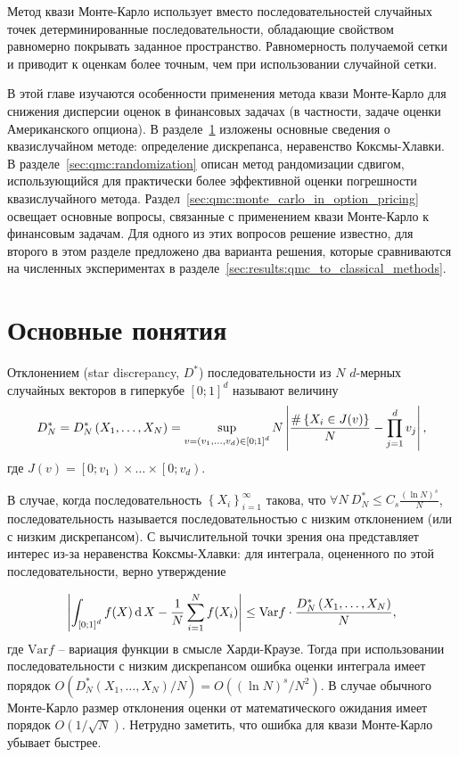 Метод квази Монте-Карло \cite{Chi2004} использует вместо последовательностей случайных точек детерминированные последовательности, обладающие свойством равномерно покрывать заданное пространство. Равномерность получаемой сетки и приводит к оценкам более точным, чем при использовании случайной сетки.

В этой главе изучаются особенности применения метода квази Монте-Карло для снижения дисперсии оценок в финансовых задачах (в частности, задаче оценки Американского опциона). В разделе~\ref{sec:qmc:qmc_definition} изложены основные сведения о квазислучайном методе: определение дискрепанса, неравенство Коксмы-Хлавки. В разделе~\ref{sec:qmc:randomization} описан метод рандомизации сдвигом, использующийся для практически более эффективной оценки погрешности квазислучайного метода. Раздел~\ref{sec:qmc:monte_carlo_in_option_pricing} освещает основные вопросы, связанные с применением квази Монте-Карло к финансовым задачам. Для одного из этих вопросов решение известно, для второго в этом разделе предложено два варианта решения, которые сравниваются на численных экспериментах в разделе~\ref{sec:results:qmc_to_classical_methods}. %

\section{Основные понятия} %
\label{sec:qmc:qmc_definition}

Отклонением (star discrepancy, $D^*$) последовательности из $N$ $d$-мерных случайных векторов в гиперкубе $\left[0;1\right]^d$ называют величину
$$D_N^* = D_N^*\left(X_1, \dots, X_N\right) = \sup_{v = (v_1, \dots, v_d) \in \left[0;1\right]^d} N \left\lvert\frac{\#\left\{ X_i \in J(v) \right\}}{N} - \prod_{j = 1}^d v_j\right\rvert,$$
где $J(v) = \left[0; v_1\right) \times \dots \times \left[0; v_d\right)$.

В случае, когда последовательность $\left\{ X_i\right\}_{i=1}^\infty$ такова, что $\forall N \: D_N^* \leq C_s \frac{(\ln N)^s}{N}$, последовательность называется последовательностью с низким отклонением (или с низким дискрепансом). С вычислительной точки зрения она представляет интерес из-за неравенства Коксмы-Хлавки: для интеграла, оцененного по этой последовательности, верно утверждение

\begin{equation}\label{eq:koksma-hlawka}
\left\lvert\int_{\left[0;1\right]^d} f(X) \operatorname{d} X - \frac{1}{N}\sum_{i=1}^N f(X_i)\right\rvert \leq \mathrm{Var}f\cdot \frac{D_N^*\left(X_1, \dots, X_N\right)}{N},
\end{equation}
где $\mathrm{Var}f$ -- вариация функции в смысле Харди-Краузе. Тогда при использовании последовательности с низким дискрепансом ошибка оценки интеграла имеет порядок $O\left(D_N^*\left(X_1, \dots, X_N\right)/N\right) = O\left((\ln N)^s / N^2\right)$. В случае обычного Монте-Карло размер отклонения оценки от математического ожидания имеет порядок $O(1 / \sqrt{N})$. Нетрудно заметить, что ошибка для квази Монте-Карло убывает быстрее.

